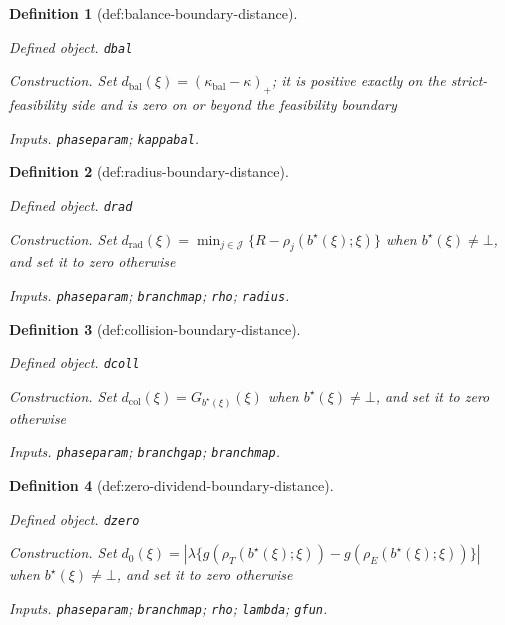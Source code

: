 \documentclass{article}
\newtheorem{definition}{Definition}
\begin{document}
\begin{definition}[def:balance-boundary-distance]\label{def:balance-boundary-distance}
\par\smallskip\noindent\emph{Defined object.} \texttt{dbal}
\par\smallskip\noindent\emph{Construction.} Set \(d_{\mathrm{bal}}(\xi)=(\kappa_{\mathrm{bal}}-\kappa)_+\); it is positive exactly on the strict-feasibility side and is zero on or beyond the feasibility boundary
\par\smallskip\noindent\emph{Inputs.} \texttt{phaseparam}; \texttt{kappabal}.
\end{definition}

\begin{definition}[def:radius-boundary-distance]\label{def:radius-boundary-distance}
\par\smallskip\noindent\emph{Defined object.} \texttt{drad}
\par\smallskip\noindent\emph{Construction.} Set \(d_{\mathrm{rad}}(\xi)=\min_{j\in\mathcal J}\{R-\rho_j(b^\star(\xi);\xi)\}\) when \(b^\star(\xi)\ne\bot\), and set it to zero otherwise
\par\smallskip\noindent\emph{Inputs.} \texttt{phaseparam}; \texttt{branchmap}; \texttt{rho}; \texttt{radius}.
\end{definition}

\begin{definition}[def:collision-boundary-distance]\label{def:collision-boundary-distance}
\par\smallskip\noindent\emph{Defined object.} \texttt{dcoll}
\par\smallskip\noindent\emph{Construction.} Set \(d_{\mathrm{col}}(\xi)=G_{b^\star(\xi)}(\xi)\) when \(b^\star(\xi)\ne\bot\), and set it to zero otherwise
\par\smallskip\noindent\emph{Inputs.} \texttt{phaseparam}; \texttt{branchgap}; \texttt{branchmap}.
\end{definition}

\begin{definition}[def:zero-dividend-boundary-distance]\label{def:zero-dividend-boundary-distance}
\par\smallskip\noindent\emph{Defined object.} \texttt{dzero}
\par\smallskip\noindent\emph{Construction.} Set \(d_0(\xi)=|\lambda\{g(\rho_T(b^\star(\xi);\xi))-g(\rho_E(b^\star(\xi);\xi))\}|\) when \(b^\star(\xi)\ne\bot\), and set it to zero otherwise
\par\smallskip\noindent\emph{Inputs.} \texttt{phaseparam}; \texttt{branchmap}; \texttt{rho}; \texttt{lambda}; \texttt{gfun}.
\end{definition}
\end{document}

